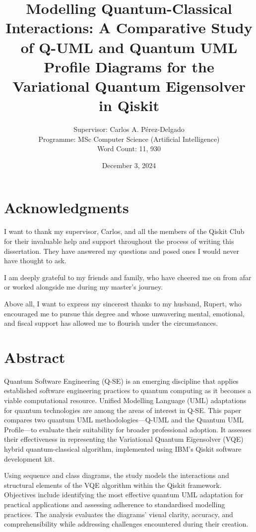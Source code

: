 \documentclass{article}
\title{Modelling Quantum-Classical Interactions: A Comparative Study of Q-UML and Quantum UML Profile Diagrams for the Variational Quantum Eigensolver in Qiskit}
\author{Supervisor: Carlos A. Pérez-Delgado\\ Programme: MSc Computer Science (Artificial Intelligence) \\ Word Count: 11, 930}
\date{December 3, 2024}
\begin{document}
\maketitle

\thispagestyle{empty} %

\newpage
\setcounter{page}{1}

\section*{Acknowledgments}

I want to thank my supervisor, Carlos, and all the members of the Qiskit Club for their invaluable help and support throughout the process of writing this dissertation. They have answered my questions and posed ones I would never have thought to ask.

I am deeply grateful to my friends and family, who have cheered me on from afar or worked alongside me during my master’s journey.

Above all, I want to express my sincerest thanks to my husband, Rupert, who encouraged me to pursue this degree and whose unwavering mental, emotional, and fiscal support has allowed me to flourish under the circumstances.

\newpage

\section*{Abstract}

Quantum Software Engineering (Q-SE) is an emerging discipline that applies established software engineering practices to quantum computing as it becomes a viable computational resource. Unified Modelling Language (UML) adaptations for quantum technologies are among the areas of interest in Q-SE. This paper compares two quantum UML methodologies—Q-UML and the Quantum UML Profile—to evaluate their suitability for broader professional adoption. It assesses their effectiveness in representing the Variational Quantum Eigensolver (VQE) hybrid quantum-classical algorithm, implemented using IBM’s Qiskit software development kit.

Using sequence and class diagrams, the study models the interactions and structural elements of the VQE algorithm within the Qiskit framework. Objectives include identifying the most effective quantum UML adaptation for practical applications and assessing adherence to standardised modelling practices. The analysis evaluates the diagrams' visual clarity, accuracy, and comprehensibility while addressing challenges encountered during their creation.
\end{document}
